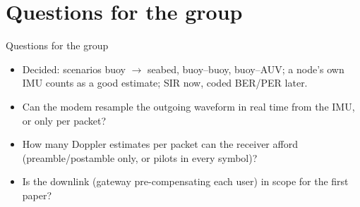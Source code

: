\documentclass[aspectratio=169,11pt]{beamer}
\begin{document}
\section{Questions for the group}

\begin{frame}{Questions for the group}
\small
\begin{itemize}
\item {\color{mute}Decided: scenarios buoy $\to$ seabed, buoy--buoy, buoy--AUV; a node's own IMU counts as a good estimate; SIR now, coded BER/PER later.}
\item Can the modem resample the outgoing waveform in real time from the IMU, or only per packet?
\item How many Doppler estimates per packet can the receiver afford (preamble/postamble only, or pilots in every symbol)?
\item Is the downlink (gateway pre-compensating each user) in scope for the first paper?
\end{itemize}
\end{frame}
\end{document}
